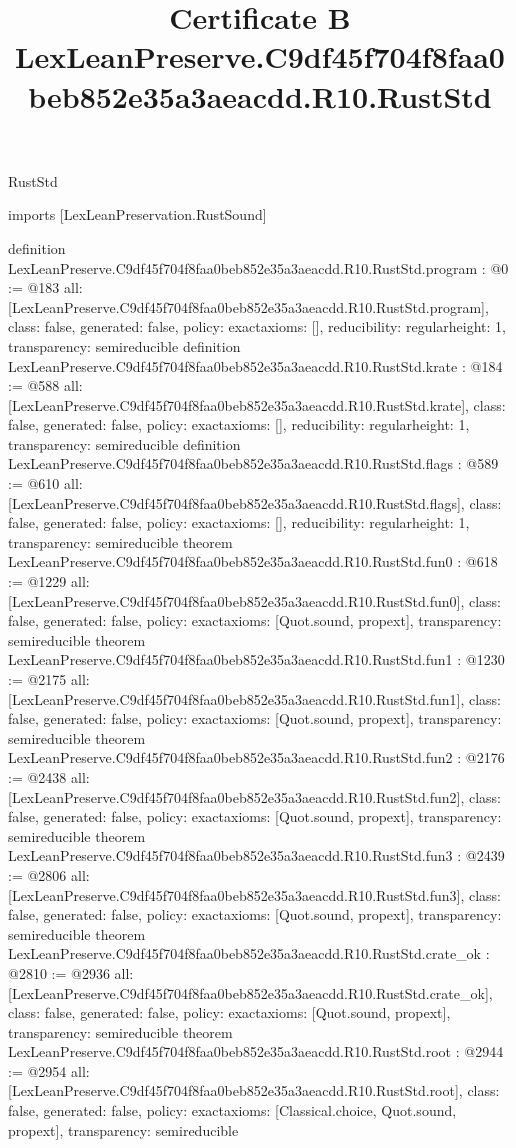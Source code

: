 \begin{lexlean}{RustStd}
\title{Certificate B LexLeanPreserve.C9df45f704f8faa0beb852e35a3aeacdd.R10.RustStd}
\begin{coremodule}
imports [LexLeanPreservation.RustSound]

definition LexLeanPreserve.C9df45f704f8faa0beb852e35a3aeacdd.R10.RustStd.program : @0 := @183 {
  all: [LexLeanPreserve.C9df45f704f8faa0beb852e35a3aeacdd.R10.RustStd.program],
  class: false,
  generated: false,
  policy: exact{axioms: []},
  reducibility: regular{height: 1},
  transparency: semireducible
}
definition LexLeanPreserve.C9df45f704f8faa0beb852e35a3aeacdd.R10.RustStd.krate : @184 := @588 {
  all: [LexLeanPreserve.C9df45f704f8faa0beb852e35a3aeacdd.R10.RustStd.krate],
  class: false,
  generated: false,
  policy: exact{axioms: []},
  reducibility: regular{height: 1},
  transparency: semireducible
}
definition LexLeanPreserve.C9df45f704f8faa0beb852e35a3aeacdd.R10.RustStd.flags : @589 := @610 {
  all: [LexLeanPreserve.C9df45f704f8faa0beb852e35a3aeacdd.R10.RustStd.flags],
  class: false,
  generated: false,
  policy: exact{axioms: []},
  reducibility: regular{height: 1},
  transparency: semireducible
}
theorem LexLeanPreserve.C9df45f704f8faa0beb852e35a3aeacdd.R10.RustStd.fun0 : @618 := @1229 {
  all: [LexLeanPreserve.C9df45f704f8faa0beb852e35a3aeacdd.R10.RustStd.fun0],
  class: false,
  generated: false,
  policy: exact{axioms: [Quot.sound, propext]},
  transparency: semireducible
}
theorem LexLeanPreserve.C9df45f704f8faa0beb852e35a3aeacdd.R10.RustStd.fun1 : @1230 := @2175 {
  all: [LexLeanPreserve.C9df45f704f8faa0beb852e35a3aeacdd.R10.RustStd.fun1],
  class: false,
  generated: false,
  policy: exact{axioms: [Quot.sound, propext]},
  transparency: semireducible
}
theorem LexLeanPreserve.C9df45f704f8faa0beb852e35a3aeacdd.R10.RustStd.fun2 : @2176 := @2438 {
  all: [LexLeanPreserve.C9df45f704f8faa0beb852e35a3aeacdd.R10.RustStd.fun2],
  class: false,
  generated: false,
  policy: exact{axioms: [Quot.sound, propext]},
  transparency: semireducible
}
theorem LexLeanPreserve.C9df45f704f8faa0beb852e35a3aeacdd.R10.RustStd.fun3 : @2439 := @2806 {
  all: [LexLeanPreserve.C9df45f704f8faa0beb852e35a3aeacdd.R10.RustStd.fun3],
  class: false,
  generated: false,
  policy: exact{axioms: [Quot.sound, propext]},
  transparency: semireducible
}
theorem LexLeanPreserve.C9df45f704f8faa0beb852e35a3aeacdd.R10.RustStd.crate_ok : @2810 := @2936 {
  all: [LexLeanPreserve.C9df45f704f8faa0beb852e35a3aeacdd.R10.RustStd.crate_ok],
  class: false,
  generated: false,
  policy: exact{axioms: [Quot.sound, propext]},
  transparency: semireducible
}
theorem LexLeanPreserve.C9df45f704f8faa0beb852e35a3aeacdd.R10.RustStd.root : @2944 := @2954 {
  all: [LexLeanPreserve.C9df45f704f8faa0beb852e35a3aeacdd.R10.RustStd.root],
  class: false,
  generated: false,
  policy: exact{axioms: [Classical.choice, Quot.sound, propext]},
  transparency: semireducible
}


\end{coremodule}
\end{lexlean}
